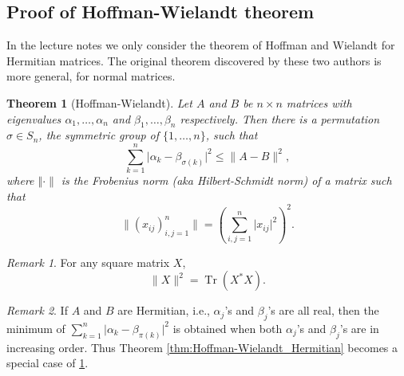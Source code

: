 \documentclass[11pt, a4paper]{article}
\numberwithin{equation}{section}
\newcommand{\ie}{i.e.}
\DeclareMathOperator{\Tr}{Tr}
\newtheorem{thm}{Theorem}
\theoremstyle{definition}
\theoremstyle{remark}
\newtheorem{rmk}{Remark}
\begin{document}
\subsection{Proof of Hoffman-Wielandt theorem} \label{subsec:H-W_theorem}

In the lecture notes we only consider the theorem of Hoffman and Wielandt for Hermitian matrices. The original theorem discovered by these two authors \cite{Hoffman-Wielandt53} is  more general, for normal matrices.
\begin{thm}[Hoffman-Wielandt] \label{thm:Hoffman-Wielandt_normal}
  Let $A$ and $B$ be $n \times n$ matrices with eigenvalues $\alpha_1, \dotsc, \alpha_n$ and $\beta_1, \dotsc, \beta_n$ respectively. Then there is a permutation $\sigma \in S_n$, the symmetric group of $\{ 1, \dotsc, n \}$, such that
  \begin{equation} \label{eq:Hoffman-Wielandt_normal}
    \sum^n_{k = 1} \lvert \alpha_k - \beta_{\sigma(k)} \rvert^2 \leq \lVert A - B \rVert^2,
  \end{equation}
  where $\Vert \cdot \rVert$ is the Frobenius norm (aka Hilbert-Schmidt norm) of a matrix such that
  \begin{equation}
    \lVert (x_{ij})^n_{i, j = 1} \rVert = \left( \sum^n_{i, j = 1} \lvert x_{ij} \rvert^2 \right)^2.
  \end{equation}
\end{thm}

\begin{rmk}
  For any square matrix $X$,
  \begin{equation} \label{eq:explicit_formula_of_Frobenius_norm}
    \lVert X \rVert^2 = \Tr(X^* X).
  \end{equation}
\end{rmk}
\begin{rmk}
  If $A$ and $B$ are Hermitian, \ie, $\alpha_j$'s and $\beta_j$'s are all real, then the minimum of $\sum^n_{k = 1} \lvert \alpha_k - \beta_{\pi(k)} \rvert^2$ is obtained when both $\alpha_j$'s and $\beta_j$'s are in increasing order. Thus Theorem \ref{thm:Hoffman-Wielandt_Hermitian} becomes a special case of \ref{thm:Hoffman-Wielandt_normal}.
\end{rmk}
\end{document}
